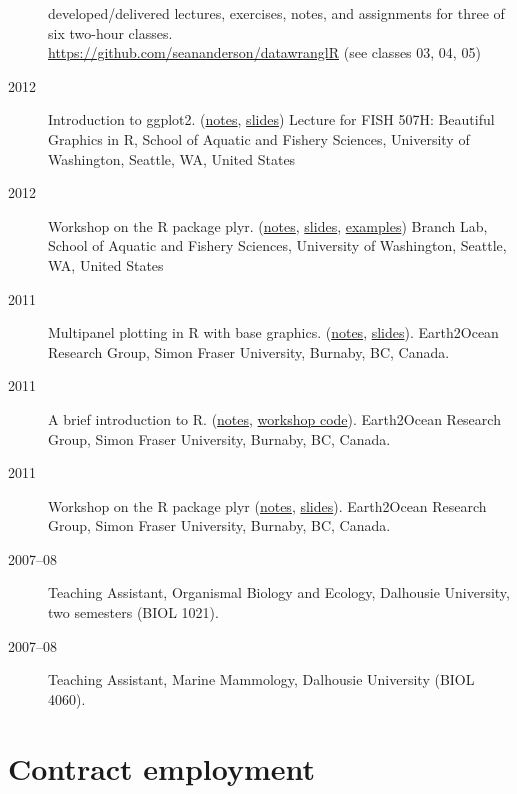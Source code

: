 \begin{description}
developed/delivered lectures, exercises, notes, and assignments for
three of six two-hour classes.\\
\url{https://github.com/seananderson/datawranglR} (see classes 03, 04,
05)
\item[2012]
Introduction to ggplot2.
(\href{http://seananderson.ca/courses/12-ggplot2/ggplot2_notes.pdf}{notes},
\href{http://seananderson.ca/courses/12-ggplot2/ggplot2_slides_with_examples.pdf}{slides})
Lecture for FISH 507H: Beautiful Graphics in R, School of Aquatic and
Fishery Sciences, University of Washington, Seattle, WA, United States
\item[2012]
Workshop on the R package plyr.
(\href{http://seananderson.ca/courses/12-plyr/plyr_2012.pdf}{notes},
\href{http://seananderson.ca/courses/12-plyr/plyr_2012_slides.pdf}{slides},
\href{http://seananderson.ca/courses/12-plyr/plyr_2012_examples.html}{examples})
Branch Lab, School of Aquatic and Fishery Sciences, University of
Washington, Seattle, WA, United States
\item[2011]
Multipanel plotting in R with base graphics.
(\href{http://seananderson.ca/courses/11-multipanel/multipanel.pdf}{notes},
\href{http://seananderson.ca/courses/11-multipanel/multipanel-slides.pdf}{slides}).
Earth2Ocean Research Group, Simon Fraser University, Burnaby, BC,
Canada.
\item[2011]
A brief introduction to R.
(\href{http://seananderson.ca/courses/11-rintro/RIntro.pdf}{notes},
\href{http://seananderson.ca/courses/11-rintro/RIntro.R}{workshop
code}). Earth2Ocean Research Group, Simon Fraser University, Burnaby,
BC, Canada.
\item[2011]
Workshop on the R package plyr
(\href{http://seananderson.ca/courses/11-plyr/plyr.pdf}{notes},
\href{http://seananderson.ca/courses/11-plyr/plyr-slides.pdf}{slides}).
Earth2Ocean Research Group, Simon Fraser University, Burnaby, BC,
Canada.
\item[2007--08]
Teaching Assistant, Organismal Biology and Ecology, Dalhousie
University, two semesters (BIOL 1021).
\item[2007--08]
Teaching Assistant, Marine Mammology, Dalhousie University (BIOL 4060).
\end{description}

\hypertarget{contract-employment}{%
\section{Contract employment}\label{contract-employment}}

